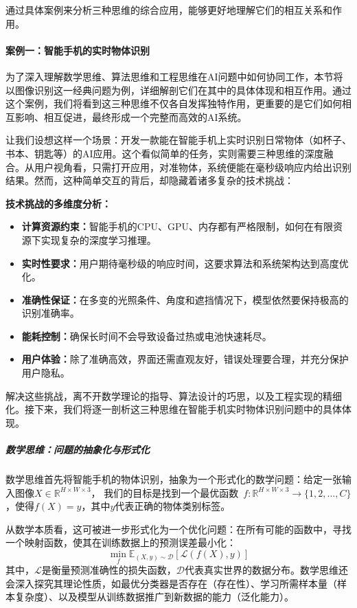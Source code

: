 通过具体案例来分析三种思维的综合应用，能够更好地理解它们的相互关系和作用。

\paragraph{案例一：智能手机的实时物体识别}
为了深入理解数学思维、算法思维和工程思维在AI问题中如何协同工作，本节将以图像识别这一经典问题为例，详细解剖它们在其中的具体体现和相互作用。通过这个案例，我们将看到这三种思维不仅各自发挥独特作用，更重要的是它们如何相互影响、相互促进，最终形成一个完整而高效的AI系统。

让我们设想这样一个场景：开发一款能在智能手机上实时识别日常物体（如杯子、书本、钥匙等）的AI应用。这个看似简单的任务，实则需要三种思维的深度融合。从用户视角看，只需打开应用，对准物体，系统便能在毫秒级响应内给出识别结果。然而，这种简单交互的背后，却隐藏着诸多复杂的技术挑战：

\textbf{技术挑战的多维度分析：}
\begin{itemize}
\item \textbf{计算资源约束：}智能手机的CPU、GPU、内存都有严格限制，如何在有限资源下实现复杂的深度学习推理。
\item \textbf{实时性要求：}用户期待毫秒级的响应时间，这要求算法和系统架构达到高度优化。
\item \textbf{准确性保证：}在多变的光照条件、角度和遮挡情况下，模型依然要保持极高的识别准确率。
\item \textbf{能耗控制：}确保长时间不会导致设备过热或电池快速耗尽。
\item \textbf{用户体验：}除了准确高效，界面还需直观友好，错误处理要合理，并充分保护用户隐私。
\end{itemize}

解决这些挑战，离不开数学理论的指导、算法设计的巧思，以及工程实现的精细化。接下来，我们将逐一剖析这三种思维在智能手机实时物体识别问题中的具体体现。

\subparagraph{数学思维：问题的抽象化与形式化}

数学思维首先将智能手机的物体识别，抽象为一个形式化的数学问题：给定一张输入图像$X \in \mathbb{R}^{H \times W \times 3}$，
我们的目标是找到一个最优函数~$f: \mathbb{R}^{H \times W \times 3} \rightarrow \{1, 2, ..., C\}$，使得$f(X) = y$，其中$y$代表正确的物体类别标签。

从数学本质看，这可被进一步形式化为一个优化问题：在所有可能的函数中，寻找一个映射函数，使其在训练数据上的预测误差最小化：
$$\min_{f} \mathbb{E}_{(X,y) \sim \mathcal{D}}[\mathcal{L}(f(X), y)]$$
其中，$\mathcal{L}$是衡量预测准确性的损失函数，$\mathcal{D}$代表真实世界的数据分布。数学思维还会深入探究其理论性质，如最优分类器是否存在（存在性）、学习所需样本量（样本复杂度）、以及模型从训练数据推广到新数据的能力（泛化能力）。
 
